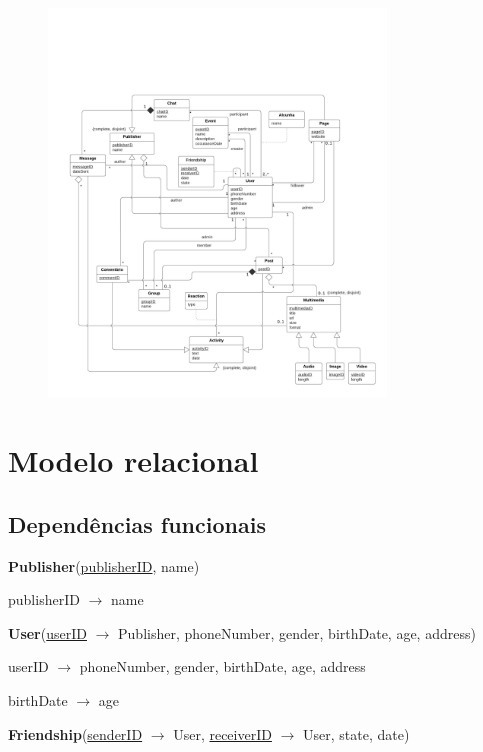 \documentclass[12pt]{report}
\begin{document}
\begin{figure}[h!]
    \centering
    \includegraphics[width=0.8\textwidth]{diagram}
\end{figure}

\chapter{Modelo relacional}

\section{Dependências funcionais}

\textbf{Publisher}(\underline{publisherID}, name)

publisherID $\rightarrow$ name

\vspace{2mm}

\textbf{User}(\underline{userID} $\rightarrow$ Publisher, phoneNumber, gender, birthDate, age, address)

userID $\rightarrow$ phoneNumber, gender, birthDate, age, address

birthDate $\rightarrow$ age

\vspace{2mm}

\textbf{Friendship}(\underline{senderID} $\rightarrow$ User, \underline{receiverID} $\rightarrow$ User, state, date)
\end{document}
